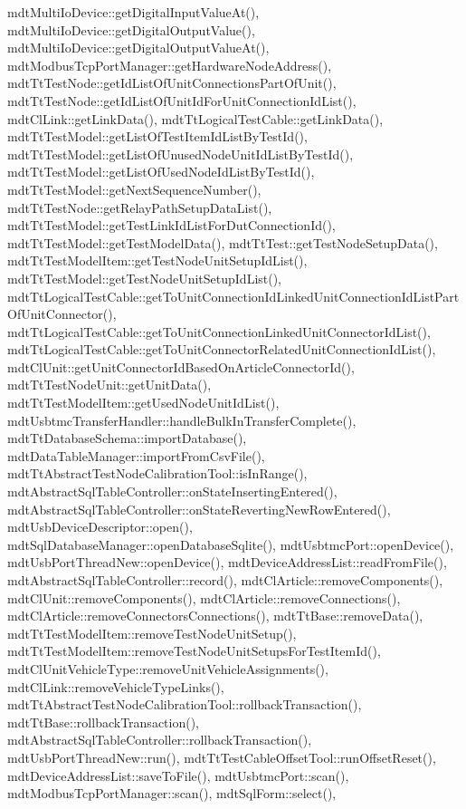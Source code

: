 mdt\-Multi\-Io\-Device\-::get\-Digital\-Input\-Value\-At(), mdt\-Multi\-Io\-Device\-::get\-Digital\-Output\-Value(), mdt\-Multi\-Io\-Device\-::get\-Digital\-Output\-Value\-At(), mdt\-Modbus\-Tcp\-Port\-Manager\-::get\-Hardware\-Node\-Address(), mdt\-Tt\-Test\-Node\-::get\-Id\-List\-Of\-Unit\-Connections\-Part\-Of\-Unit(), mdt\-Tt\-Test\-Node\-::get\-Id\-List\-Of\-Unit\-Id\-For\-Unit\-Connection\-Id\-List(), mdt\-Cl\-Link\-::get\-Link\-Data(), mdt\-Tt\-Logical\-Test\-Cable\-::get\-Link\-Data(), mdt\-Tt\-Test\-Model\-::get\-List\-Of\-Test\-Item\-Id\-List\-By\-Test\-Id(), mdt\-Tt\-Test\-Model\-::get\-List\-Of\-Unused\-Node\-Unit\-Id\-List\-By\-Test\-Id(), mdt\-Tt\-Test\-Model\-::get\-List\-Of\-Used\-Node\-Id\-List\-By\-Test\-Id(), mdt\-Tt\-Test\-Model\-::get\-Next\-Sequence\-Number(), mdt\-Tt\-Test\-Node\-::get\-Relay\-Path\-Setup\-Data\-List(), mdt\-Tt\-Test\-Model\-::get\-Test\-Link\-Id\-List\-For\-Dut\-Connection\-Id(), mdt\-Tt\-Test\-Model\-::get\-Test\-Model\-Data(), mdt\-Tt\-Test\-::get\-Test\-Node\-Setup\-Data(), mdt\-Tt\-Test\-Model\-Item\-::get\-Test\-Node\-Unit\-Setup\-Id\-List(), mdt\-Tt\-Test\-Model\-::get\-Test\-Node\-Unit\-Setup\-Id\-List(), mdt\-Tt\-Logical\-Test\-Cable\-::get\-To\-Unit\-Connection\-Id\-Linked\-Unit\-Connection\-Id\-List\-Part\-Of\-Unit\-Connector(), mdt\-Tt\-Logical\-Test\-Cable\-::get\-To\-Unit\-Connection\-Linked\-Unit\-Connector\-Id\-List(), mdt\-Tt\-Logical\-Test\-Cable\-::get\-To\-Unit\-Connector\-Related\-Unit\-Connection\-Id\-List(), mdt\-Cl\-Unit\-::get\-Unit\-Connector\-Id\-Based\-On\-Article\-Connector\-Id(), mdt\-Tt\-Test\-Node\-Unit\-::get\-Unit\-Data(), mdt\-Tt\-Test\-Model\-Item\-::get\-Used\-Node\-Unit\-Id\-List(), mdt\-Usbtmc\-Transfer\-Handler\-::handle\-Bulk\-In\-Transfer\-Complete(), mdt\-Tt\-Database\-Schema\-::import\-Database(), mdt\-Data\-Table\-Manager\-::import\-From\-Csv\-File(), mdt\-Tt\-Abstract\-Test\-Node\-Calibration\-Tool\-::is\-In\-Range(), mdt\-Abstract\-Sql\-Table\-Controller\-::on\-State\-Inserting\-Entered(), mdt\-Abstract\-Sql\-Table\-Controller\-::on\-State\-Reverting\-New\-Row\-Entered(), mdt\-Usb\-Device\-Descriptor\-::open(), mdt\-Sql\-Database\-Manager\-::open\-Database\-Sqlite(), mdt\-Usbtmc\-Port\-::open\-Device(), mdt\-Usb\-Port\-Thread\-New\-::open\-Device(), mdt\-Device\-Address\-List\-::read\-From\-File(), mdt\-Abstract\-Sql\-Table\-Controller\-::record(), mdt\-Cl\-Article\-::remove\-Components(), mdt\-Cl\-Unit\-::remove\-Components(), mdt\-Cl\-Article\-::remove\-Connections(), mdt\-Cl\-Article\-::remove\-Connectors\-Connections(), mdt\-Tt\-Base\-::remove\-Data(), mdt\-Tt\-Test\-Model\-Item\-::remove\-Test\-Node\-Unit\-Setup(), mdt\-Tt\-Test\-Model\-Item\-::remove\-Test\-Node\-Unit\-Setups\-For\-Test\-Item\-Id(), mdt\-Cl\-Unit\-Vehicle\-Type\-::remove\-Unit\-Vehicle\-Assignments(), mdt\-Cl\-Link\-::remove\-Vehicle\-Type\-Links(), mdt\-Tt\-Abstract\-Test\-Node\-Calibration\-Tool\-::rollback\-Transaction(), mdt\-Tt\-Base\-::rollback\-Transaction(), mdt\-Abstract\-Sql\-Table\-Controller\-::rollback\-Transaction(), mdt\-Usb\-Port\-Thread\-New\-::run(), mdt\-Tt\-Test\-Cable\-Offset\-Tool\-::run\-Offset\-Reset(), mdt\-Device\-Address\-List\-::save\-To\-File(), mdt\-Usbtmc\-Port\-::scan(), mdt\-Modbus\-Tcp\-Port\-Manager\-::scan(), mdt\-Sql\-Form\-::select(), 